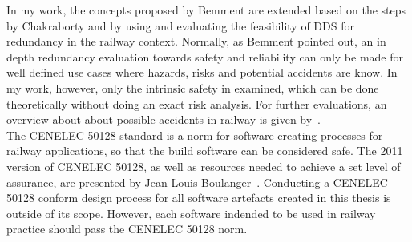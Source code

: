 In my work, the concepts proposed by Bemment \etal are extended based on the steps by Chakraborty and by using and evaluating the feasibility of \gls*{DDS} for redundancy in the railway context.
Normally, as Bemment \etal pointed out, an in depth redundancy evaluation towards safety and reliability can only be made for well defined use cases where hazards, risks and potential accidents are know.
In my work, however, only the intrinsic safety in examined, which can be done theoretically without doing an exact risk analysis.
For further evaluations, an overview about about possible accidents in railway is given by~\cite{ERTMSRailwayAccidents}.
\\

The CENELEC 50128 standard is a norm for software creating processes for railway applications, so that the build software can be considered safe.
The 2011 version of CENELEC 50128, as well as resources needed to achieve a set level of assurance, are presented by Jean-Louis Boulanger~\cite{BoulangerStandards}.
Conducting a CENELEC 50128 conform design process for all software artefacts created in this thesis is outside of its scope.
However, each software indended to be used in railway practice should pass the CENELEC 50128 norm.
\\

